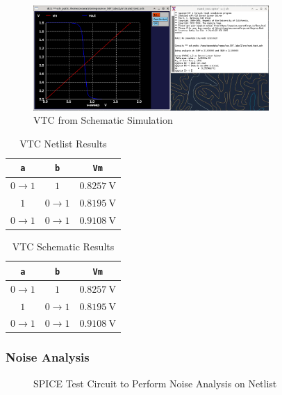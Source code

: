 \documentclass{article}
\begin{document}
	\begin{figure}[H]
		\centerline{\includegraphics[width=0.8\textwidth]{nand_vtc_schem.png}}
		\caption{VTC from Schematic Simulation}
		\label{fig::nand_vtc_schem}
	\end{figure}
	
	\begin{table}[H]
	\begin{center}
	\caption{VTC Netlist Results}
	\label{table::vtc_netlist}
	\begin{tabular}{| c | c | c |}
		\hline
		\texttt{a} & \texttt{b} & \texttt{Vm}\\
		\hline	
		$0 \rightarrow 1$ & $1$ & $0.8257\ \text{V}$\\
		\hline	
		$1$ & $0 \rightarrow 1$ & $0.8195\ \text{V}$\\
		\hline	
		$0 \rightarrow 1$ & $0 \rightarrow 1$ & $0.9108\ \text{V}$\\
		\hline
	\end{tabular}
	\end{center}
	\end{table}
	
	\begin{table}[H]
	\begin{center}
	\caption{VTC Schematic Results}
	\label{table::vtc_schematic}
	\begin{tabular}{| c | c | c |}
		\hline
		\texttt{a} & \texttt{b} & \texttt{Vm}\\
		\hline	
		$0 \rightarrow 1$ & $1$ & $0.8257\ \text{V}$\\
		\hline	
		$1$ & $0 \rightarrow 1$ & $0.8195\ \text{V}$\\
		\hline	
		$0 \rightarrow 1$ & $0 \rightarrow 1$ & $0.9108\ \text{V}$\\
		\hline
	\end{tabular}
	\end{center}
	\end{table}
	
	\subsubsection{Noise Analysis}
	\begin{figure}[H]
		
		\caption{SPICE Test Circuit to Perform Noise Analysis on Netlist}
		\label{fig::nand_noise_analysis_test_circuit}
	\end{figure}
	
\end{document}
